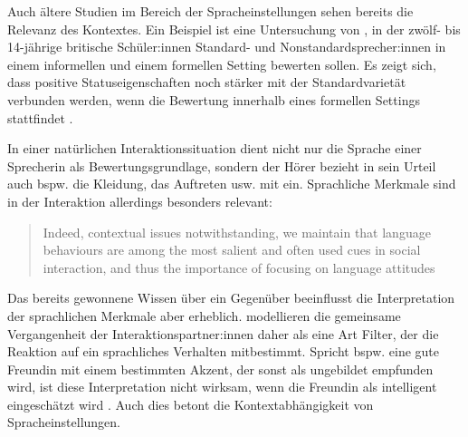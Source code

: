 Auch ältere Studien im Bereich der Spracheinstellungen sehen bereits die Relevanz des Kontextes.
Ein Beispiel ist eine Untersuchung von \citet{Creber.1983}, in der zwölf- bis 14-jährige britische Schüler:innen Standard- und Nonstandardsprecher:innen in einem informellen und einem formellen Setting bewerten sollen. 
Es zeigt sich, dass positive Statuseigenschaften noch stärker mit der Standardvarietät verbunden werden, wenn die Bewertung innerhalb eines formellen Settings stattfindet \citep[s.][159]{Creber.1983}.

In einer nat{\"u}rlichen Interaktionssituation dient nicht nur die Sprache einer Sprecherin als Bewertungsgrundlage, sondern der H{\"o}rer bezieht in sein Urteil auch bspw. die Kleidung, das Auftreten usw. mit ein. 
Sprachliche Merkmale sind in der Interaktion allerdings besonders relevant: \begin{quote} Indeed, contextual issues notwithstanding, we maintain that language behaviours are among the most salient and often used cues in social interaction, and thus the importance of focusing on language attitudes~\citep[215]{Cargile.1994} \end{quote}
Das bereits gewonnene Wissen über ein Gegenüber beeinflusst die Interpretation der sprachlichen Merkmale aber erheblich. 
\citet{Cargile.1994} modellieren die gemeinsame Vergangenheit der Interaktionspartner:innen daher als eine Art Filter, der die Reaktion auf ein sprachliches Verhalten mitbestimmt. 
Spricht bspw. eine gute Freundin mit einem bestimmten Akzent, der sonst als ungebildet empfunden wird, ist diese Interpretation nicht wirksam, wenn die Freundin als intelligent eingesch{\"a}tzt wird \citep[s.][222--223]{Cargile.1994}. 
Auch dies betont die Kontextabh{\"a}ngigkeit von Spracheinstellungen.

